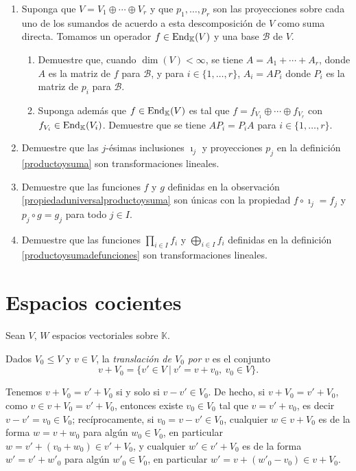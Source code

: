 \begin{enumerate}
  \item Suponga que $V=V_1\oplus\cdots\oplus V_r$ y que $p_1,\ldots,p_r$ son las proyecciones sobre cada uno de los sumandos de acuerdo a esta descomposición de $V$ como suma directa. Tomamos un operador $f\in\operatorname{End}_\mathbb{K}(V)$ y una base $\mathcal{B}$ de $V$.
    \begin{enumerate}
      \item Demuestre que, cuando $\dim(V)<\infty$, se tiene $A=A_1+\cdots+A_r$, donde $A$ es la matriz de $f$ para $\mathcal{B}$, y para $i\in\{1,\ldots,r\}$, $A_i=AP_i$ donde $P_i$ es la matriz de $p_i$ para $\mathcal{B}$.
      \item Suponga además que $f\in\operatorname{End}_\mathbb{K}(V)$ es tal que $f=f_{V_1}\oplus\cdots\oplus f_{V_r}$ con $f_{V_i}\in\operatorname{End}_\mathbb{K}(V_i)$. Demuestre que se tiene $AP_i=P_iA$ para $i\in\{1,\ldots,r\}$.
    \end{enumerate}
  \item Demuestre que las $j$-ésimas inclusiones $\imath_j$ y proyecciones $p_j$ en la definición \ref{productoysuma} son transformaciones lineales. 
  \item Demuestre que las funciones $f$ y $g$ definidas en la observación \ref{propiedaduniversalproductoysuma} son únicas con la propiedad $f\circ\imath_j=f_j$ y $p_j\circ g=g_j$ para todo $j\in I$.
  \item Demuestre que las funciones $\prod_{i\in I} f_i$ y $\bigoplus_{i\in I} f_i$ definidas en la definición \ref{productoysumadefunciones} son transformaciones lineales.
\end{enumerate}

\section{Espacios cocientes}

Sean $V$, $W$ espacios vectoriales sobre $\mathbb{K}$.

\begin{defn}
Dados $V_0\le V$ y $v\in V$, la \emph{translaci\'on de $V_0$ por $v$} es el conjunto
\[
v+V_0=\{v'\in V\ |\ v'=v+v_0,\ v_0\in V\}.
\]
\end{defn}

\begin{obs}
Tenemos $v+V_0=v'+V_0$ si y solo si $v-v'\in V_0$. De hecho, si $v+V_0=v'+V_0$, como $v\in v+V_0=v'+V_0$, entonces existe $v_0\in V_0$ tal que $v=v'+v_0$, es decir $v-v'=v_0\in V_0$; rec\'iprocamente, si $v_0=v-v'\in V_0$, cualquier $w\in v+V_0$ es de la forma $w=v+w_0$ para alg\'un $w_0\in V_0$, en particular $w=v'+(v_0+w_0)\in v'+V_0$, y cualquier $w'\in v'+V_0$ es de la forma $w'=v'+w'_0$ para alg\'un $w'_0\in V_0$, en particular $w'=v+(w'_0-v_0)\in v+V_0$.
\end{obs}

